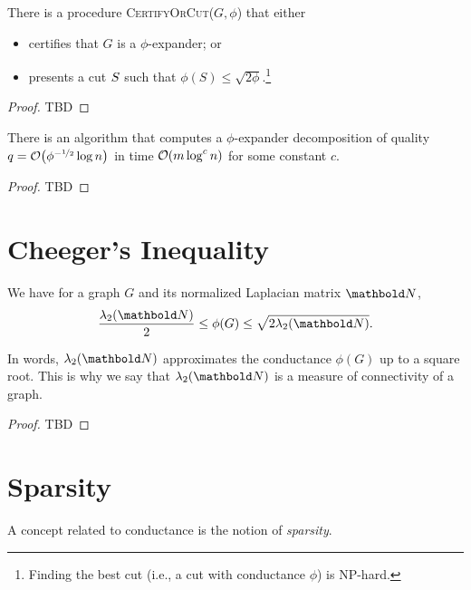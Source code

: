 \begin{thm}
There is a procedure \textsc{CertifyOrCut($G, \phi$)} that either \begin{itemize}
    \item certifies that $G$ is a $\phi$-expander; or
    \item presents a cut $S$ such that $\phi(S) \leq \sqrt{2\phi}$.\footnote{Finding the best cut (i.e., a cut with conductance $\phi$) is NP-hard.}
\end{itemize}
\end{thm}
\begin{proof}
TBD
\end{proof}

\begin{thm}
There is an algorithm that computes a $\phi$-expander decomposition of quality $q = \LandauO{\phi^{-\nicefrac{1}{2}} \log n}$ in time $\LandauO{m \log^c n}$ for some constant $c$.
\end{thm}
\begin{proof}
TBD
\end{proof}

\section{Cheeger's Inequality}

\begin{thm} We have for a graph $G$ and its normalized Laplacian matrix $\mN$, \begin{align}
    \frac{\lambda_2(\mN)}{2} \leq \phi(G) \leq \sqrt{2 \lambda_2(\mN)}.
\end{align}
\end{thm}\noindent In words, $\lambda_2(\mN)$ approximates the conductance $\phi(G)$ up to a square root. This is why we say that $\lambda_2(\mN)$ is a measure of connectivity of a graph.

\begin{proof}
TBD
\end{proof}

\section{Sparsity}

A concept related to conductance is the notion of \emph{sparsity}.

